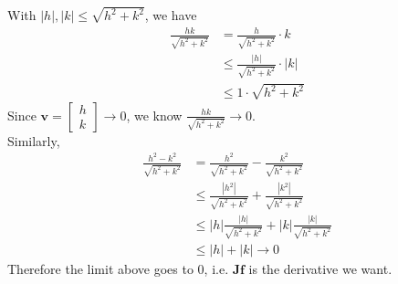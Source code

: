 \documentclass{article}
\begin{document}
With $|h|, |k| \leq \sqrt{h^2+k^2}$, we have
\begin{equation*}
    \begin{split}
        \frac{hk}{\sqrt{h^2+k^2}} &= \frac{h}{\sqrt{h^2+k^2}}\cdot k\\
        &\leq \frac{|h|}{\sqrt{h^2+k^2}}\cdot |k|\\
        &\leq 1\cdot \sqrt{h^2+k^2}
    \end{split}
\end{equation*}
Since $\mathbf{v} = \begin{bmatrix}
    h\\
    k
\end{bmatrix} \rightarrow 0$, we know $\frac{hk}{\sqrt{h^2+k^2}}\rightarrow 0$.\\
Similarly,
\begin{equation*}
    \begin{split}
        \frac{h^2-k^2}{\sqrt{h^2+k^2}} &= \frac{h^2}{\sqrt{h^2+k^2}} - \frac{k^2}{\sqrt{h^2+k^2}}\\
        &\leq \frac{|h^2|}{\sqrt{h^2+k^2}} + \frac{|k^2|}{\sqrt{h^2+k^2}}\\
        &\leq |h|\frac{|h|}{\sqrt{h^2+k^2}} + |k|\frac{|k|}{\sqrt{h^2+k^2}}\\
        &\leq |h| + |k| \rightarrow 0
    \end{split}
\end{equation*}
Therefore the limit above goes to $0$, i.e. $\mathbf{Jf}$ is the derivative we want.
\end{document}
